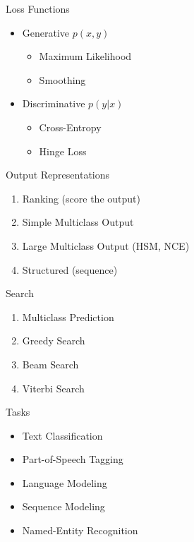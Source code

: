\documentclass{beamer}
\begin{document}
\begin{frame}{Loss Functions}
  \begin{itemize}
  \item Generative $p(x, y)$
    \begin{itemize}
    \item Maximum Likelihood
    \item Smoothing
    \end{itemize}
  \item Discriminative $p(y | x)$
    \begin{itemize}
    \item Cross-Entropy 
     \item Hinge Loss
    \end{itemize}
  \end{itemize}
\end{frame}


{

}



\begin{frame}{Output Representations}
  \begin{enumerate}
  \item Ranking (score the output)
  \item Simple Multiclass Output
  \item Large Multiclass Output (HSM, NCE) 
  \item Structured (sequence)
  \end{enumerate}
\end{frame}


\begin{frame}{Search}
  \begin{enumerate}
  \item Multiclass Prediction
  \item Greedy Search
  \item Beam Search
  \item Viterbi Search
  \end{enumerate}
\end{frame}

\begin{frame}{Tasks}
  \begin{itemize}
  \item Text Classification 
  \item Part-of-Speech Tagging
  \item Language Modeling
  \item Sequence Modeling
  \item Named-Entity Recognition
  \end{itemize}
\end{frame}
\end{document}
